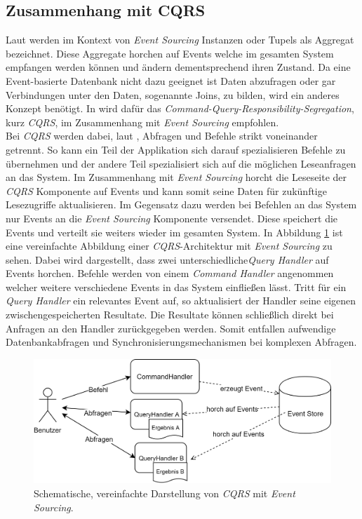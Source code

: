 \subsection{Zusammenhang mit CQRS}
\label{sub:transaction:cqrs}
Laut \cite{vernon2013implementing} werden im Kontext von \textit{Event Sourcing} Instanzen oder Tupels als Aggregat bezeichnet. Diese Aggregate horchen auf  Events welche im gesamten System empfangen werden können und ändern dementsprechend ihren Zustand. Da eine Event-basierte Datenbank nicht dazu geeignet ist Daten abzufragen oder gar Verbindungen unter den Daten, sogenannte Joins, zu bilden, wird ein anderes Konzept benötigt. In \cite{vernon2013implementing} wird dafür das \textit{Command-Query-Responsibility-Segregation}, kurz \textit{CQRS}, im Zusammenhang mit \textit{Event Sourcing} empfohlen. \\
Bei \textit{CQRS} werden dabei, laut \cite{cqrsYoung2010}, Abfragen und  Befehle strikt voneinander getrennt. So kann ein Teil der Applikation sich darauf spezialisieren Befehle zu übernehmen und der andere Teil spezialisiert sich auf die möglichen Leseanfragen an das System. Im Zusammenhang mit \textit{Event Sourcing} horcht die Leseseite der \textit{CQRS} Komponente auf Events und kann somit seine Daten für zukünftige Lesezugriffe aktualisieren. Im Gegensatz dazu werden bei Befehlen an das System nur Events an die \textit{Event Sourcing} Komponente versendet. Diese speichert die Events und verteilt sie weiters wieder im gesamten System. In Abbildung \ref{fig:transactionTheory:eventSourcing:cqrs} ist eine vereinfachte Abbildung einer \textit{CQRS}-Architektur mit \textit{Event Sourcing} zu sehen. Dabei wird dargestellt, dass zwei unterschiedliche\textit{Query Handler} auf Events horchen. Befehle werden von einem \textit{Command Handler} angenommen welcher weitere verschiedene Events in das System einfließen lässt. Tritt für ein \textit{Query Handler} ein relevantes Event auf, so aktualisiert der Handler seine eigenen zwischengespeicherten Resultate. Die Resultate können schließlich direkt bei Anfragen an den Handler zurückgegeben werden. Somit entfallen aufwendige Datenbankabfragen und Synchronisierungsmechanismen bei komplexen Abfragen. \\

\begin{figure}
    \centering
    \includegraphics[width=\linewidth]{gfx/other/eventSourcingCqrs}
    \caption{Schematische, vereinfachte Darstellung von \textit{CQRS} mit \textit{Event Sourcing}.}
    \label{fig:transactionTheory:eventSourcing:cqrs}
\end{figure}

